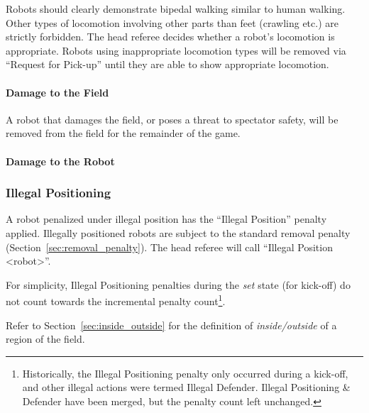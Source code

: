 Robots should clearly demonstrate bipedal walking similar to human walking. Other types of locomotion involving other parts than feet (crawling etc.) are strictly forbidden.
The head referee decides whether a robot's locomotion is appropriate. Robots using inappropriate locomotion types will be removed via ``Request for Pick-up'' until they are able to show appropriate locomotion.

\paragraph{Damage to the Field}
\label{sec:damage}

A robot that damages the field, or poses a threat to spectator safety, will be removed from the field for the remainder of the game.

\paragraph{Damage to the Robot}
\label{sec:damage_robot}


\subsubsection{Illegal Positioning}
\label{sec:illegal_positioning}

A robot penalized under illegal position has the ``Illegal Position'' penalty applied. Illegally positioned robots are subject to the standard removal penalty (\cf Section~\ref{sec:removal_penalty}).
The head referee will call ``Illegal Position  \textless robot\textgreater''.

For simplicity, Illegal Positioning penalties during the \textit{set} state (for kick-off) do not count towards the incremental penalty count\footnote{Historically, the Illegal Positioning penalty only occurred during a kick-off, and other illegal actions were termed Illegal Defender. Illegal Positioning \& Defender have been merged, but the penalty count left unchanged.}.

Refer to Section~\ref{sec:inside_outside} for the definition of \textit{inside/outside} of a region of the field.


